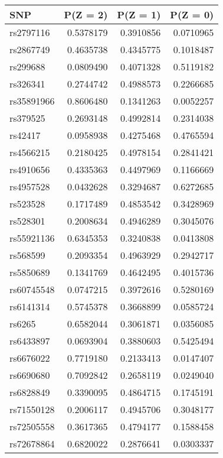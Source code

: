 \documentclass[
]{article}
\theoremstyle{plain}
\begin{document}
{\begin{table}[H]
\begin{minipage}{0.5\linewidth}
  \end{minipage}
  \qquad
  \begin{minipage}{0.5\linewidth}
    \center
    \begin{table}[H]
\centering
\begin{tabular}{lrrr}
\toprule
SNP & P(Z = 2) & P(Z = 1) & P(Z = 0)\\
\midrule
rs2797116 & 0.5378179 & 0.3910856 & 0.0710965\\
rs2867749 & 0.4635738 & 0.4345775 & 0.1018487\\
rs299688 & 0.0809490 & 0.4071328 & 0.5119182\\
rs326341 & 0.2744742 & 0.4988573 & 0.2266685\\
rs35891966 & 0.8606480 & 0.1341263 & 0.0052257\\
\addlinespace
rs379525 & 0.2693148 & 0.4992814 & 0.2314038\\
rs42417 & 0.0958938 & 0.4275468 & 0.4765594\\
rs4566215 & 0.2180425 & 0.4978154 & 0.2841421\\
rs4910656 & 0.4335363 & 0.4497969 & 0.1166669\\
rs4957528 & 0.0432628 & 0.3294687 & 0.6272685\\
\addlinespace
rs523528 & 0.1717489 & 0.4853542 & 0.3428969\\
rs528301 & 0.2008634 & 0.4946289 & 0.3045076\\
rs55921136 & 0.6345353 & 0.3240838 & 0.0413808\\
rs568599 & 0.2093354 & 0.4963929 & 0.2942717\\
rs5850689 & 0.1341769 & 0.4642495 & 0.4015736\\
\addlinespace
rs60745548 & 0.0747215 & 0.3972616 & 0.5280169\\
rs6141314 & 0.5745378 & 0.3668899 & 0.0585724\\
rs6265 & 0.6582044 & 0.3061871 & 0.0356085\\
rs6433897 & 0.0693904 & 0.3880603 & 0.5425494\\
rs6676022 & 0.7719180 & 0.2133413 & 0.0147407\\
\addlinespace
rs6690680 & 0.7092842 & 0.2658119 & 0.0249040\\
rs6828849 & 0.3390095 & 0.4864715 & 0.1745191\\
rs71550128 & 0.2006117 & 0.4945706 & 0.3048177\\
rs72505558 & 0.3617365 & 0.4794177 & 0.1588458\\
rs72678864 & 0.6820022 & 0.2876641 & 0.0303337\\

\end{tabular}
\end{table}
\end{minipage}
\end{table}}
\end{document}

